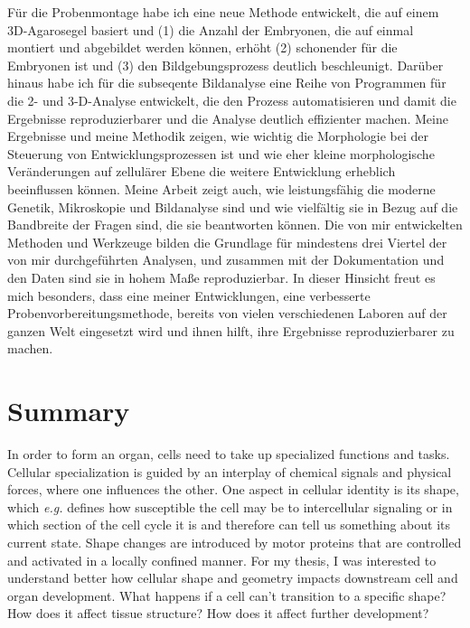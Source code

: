 \documentclass[11pt,singlespacinge,twoside]{reedthesis} %
\theoremstyle{definition}
\theoremstyle{definition}
\theoremstyle{definition}
\theoremstyle{remark}
\begin{document}
Für die Probenmontage habe ich eine neue Methode entwickelt, die auf einem 3D-Agarosegel basiert und (1) die Anzahl der Embryonen, die auf einmal montiert und abgebildet werden können, erhöht (2) schonender für die Embryonen ist und (3) den Bildgebungsprozess deutlich beschleunigt. Darüber hinaus habe ich für die subseqente Bildanalyse eine Reihe von Programmen für die 2- und 3-D-Analyse entwickelt, die den Prozess automatisieren und damit die Ergebnisse reproduzierbarer und die Analyse deutlich effizienter machen. Meine Ergebnisse und meine Methodik zeigen, wie wichtig die Morphologie bei der Steuerung von Entwicklungsprozessen ist und wie eher kleine morphologische Veränderungen auf zellulärer Ebene die weitere Entwicklung erheblich beeinflussen können. Meine Arbeit zeigt auch, wie leistungsfähig die moderne Genetik, Mikroskopie und Bildanalyse sind und wie vielfältig sie in Bezug auf die Bandbreite der Fragen sind, die sie beantworten können. Die von mir entwickelten Methoden und Werkzeuge bilden die Grundlage für mindestens drei Viertel der von mir durchgeführten Analysen, und zusammen mit der Dokumentation und den Daten sind sie in hohem Maße reproduzierbar. In dieser Hinsicht freut es mich besonders, dass eine meiner Entwicklungen, eine verbesserte Probenvorbereitungsmethode, bereits von vielen verschiedenen Laboren auf der ganzen Welt eingesetzt wird und ihnen hilft, ihre Ergebnisse reproduzierbarer zu machen.

\hypertarget{summary}{%
\chapter*{Summary}\label{summary}}

In order to form an organ, cells need to take up specialized functions and tasks. Cellular specialization is guided by an interplay of chemical signals and physical forces, where one influences the other. One aspect in cellular identity is its shape, which \emph{e.g.} defines how susceptible the cell may be to intercellular signaling or in which section of the cell cycle it is and therefore can tell us something about its current state. Shape changes are introduced by motor proteins that are controlled and activated in a locally confined manner. For my thesis, I was interested to understand better how cellular shape and geometry impacts downstream cell and organ development. What happens if a cell can't transition to a specific shape? How does it affect tissue structure? How does it affect further development?
\end{document}
